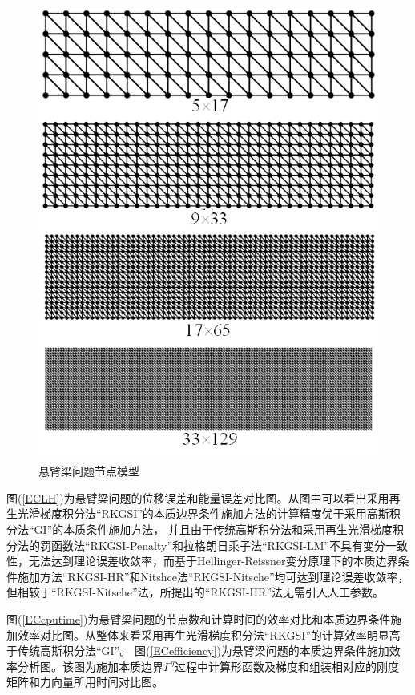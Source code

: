 \begin{figure}[H]
    \centering
    \includegraphics[scale=0.7]{figure/EHR/cantilever/cantilever.mesh.png}
    \caption{悬臂梁问题节点模型}\label{cantilever.mesh}
\end{figure}
图(\ref{ECLH})为悬臂梁问题的位移误差和能量误差对比图。从图中可以看出采用再生光滑梯度积分法“RKGSI”的本质边界条件施加方法的计算精度优于采用高斯积分法“GI”的本质条件施加方法，
并且由于传统高斯积分法和采用再生光滑梯度积分法的罚函数法“RKGSI-Penalty”和拉格朗日乘子法“RKGSI-LM”不具有变分一致性，无法达到理论误差收敛率，而基于Hellinger-Reissner变分原理下的本质边界条件施加方法“RKGSI-HR”和Nitshce法“RKGSI-Nitsche”均可达到理论误差收敛率，但相较于“RKGSI-Nitsche”法，所提出的“RKGSI-HR”法无需引入人工参数。
\par
图(\ref{ECcputime})为悬臂梁问题的节点数和计算时间的效率对比和本质边界条件施加效率对比图。从整体来看采用再生光滑梯度积分法“RKGSI”的计算效率明显高于传统高斯积分法“GI”。
图(\ref{ECefficiency})为悬臂梁问题的本质边界条件施加效率分析图。该图为施加本质边界$\Gamma^g$过程中计算形函数及梯度和组装相对应的刚度矩阵和力向量所用时间对比图。
